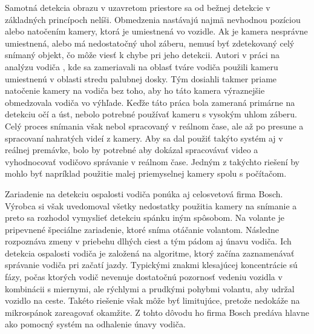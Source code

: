 \documentclass[slovak,master,dept460,male,cpp,cpdeclaration]{diploma}
\begin{document}
Samotná detekcia obrazu v uzavretom priestore sa od bežnej detekcie v základných princípoch nelíši. Obmedzenia nastávajú najmä nevhodnou pozíciou alebo natočením kamery, ktorá je umiestnená vo vozidle. Ak je kamera nesprávne umiestnená, alebo má nedostatočný uhol záberu, nemusí byť zdetekovaný celý snímaný objekt, čo môže viesť k chybe pri jeho detekcii. Autori v práci na analýzu vodiča \cite{smith2003determining}, kde sa zameriavali na oblasť tváre vodiča použili kameru umiestnenú v oblasti stredu palubnej dosky. Tým dosiahli takmer priame natočenie kamery na vodiča bez toho, aby ho táto kamera výraznejšie obmedzovala vodiča vo výhľade. Keďže táto práca bola zameraná primárne na detekciu očí a úst, nebolo potrebné  používať kameru s vysokým uhlom záberu. Celý proces snímania však nebol spracovaný v reálnom čase, ale až po presune a spracovaní nahratých videí z kamery. Aby sa dal použiť takýto systém aj v reálnej premávke, bolo by potrebné aby dokázal spracovávať video  a vyhodnocovať vodičovo správanie v reálnom čase. Jedným z takýchto riešení by mohlo byť napríklad použitie malej priemyselnej kamery spolu s počítačom.\par
Zariadenie na detekciu ospalosti vodiča  ponúka aj celosvetová firma Bosch. Výrobca si však uvedomoval všetky nedostatky použitia kamery na snímanie a preto sa rozhodol vymyslieť detekciu  spánku iným spôsobom. Na volante je pripevnené špeciálne zariadenie, ktoré sníma otáčanie volantom. Následne rozpoznáva zmeny v priebehu dlhých ciest a tým pádom aj únavu vodiča. Ich detekcia ospalosti vodiča je založená na algoritme, ktorý začína zaznamenávať správanie vodiča pri začatí jazdy. Typickými znakmi klesajúcej koncentrácie sú fázy, počas ktorých vodič nevenuje dostatočnú pozornosť vedeniu vozidla v kombinácii s miernymi, ale rýchlymi a prudkými pohybmi volantu, aby udržal vozidlo na ceste. Takéto riešenie však môže byť limitujúce, pretože nedokáže na mikrospánok zareagovať okamžite. Z tohto dôvodu ho firma Bosch predáva hlavne ako pomocný systém na odhalenie únavy vodiča. \par
\end{document}
